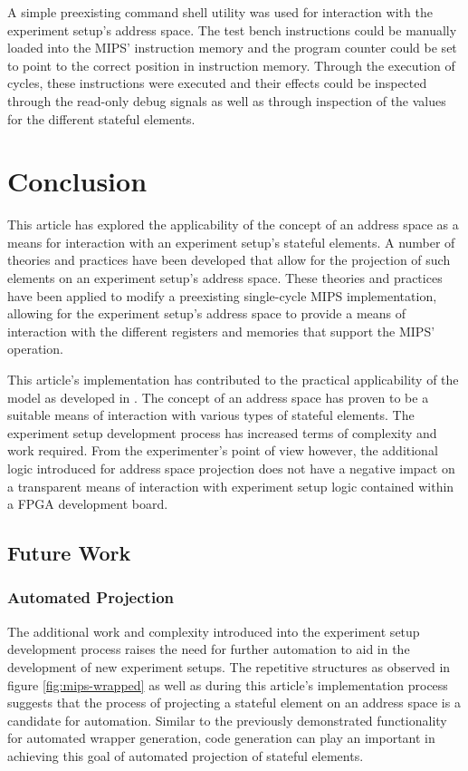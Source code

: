 \documentclass{article}
\begin{document}
A simple preexisting command shell utility was used for interaction with the experiment setup's address space. The test bench instructions could be manually loaded into the MIPS' instruction memory and the program counter could be set to point to the correct position in instruction memory. Through the execution of cycles, these instructions were executed and their effects could be inspected through the read-only debug signals as well as through inspection of the values for the different stateful elements. 




\section{Conclusion}
This article has explored the applicability of the concept of an address space as a means for interaction with an experiment setup's stateful elements. A number of theories and practices have been developed that allow for the projection of such elements on an experiment setup's address space. These theories and practices have been applied to modify a preexisting single-cycle MIPS implementation, allowing for the experiment setup's address space to provide a means of interaction with the different registers and memories that support the MIPS' operation. 

This article's implementation has contributed to the practical applicability of the model as developed in \cite{bos2016model}. The concept of an address space has proven to be a suitable means of interaction with various types of stateful elements. The experiment setup development process has increased terms of complexity and work required. From the experimenter's point of view however, the additional logic introduced for address space projection does not have a negative impact on a transparent means of interaction with experiment setup logic contained within a FPGA development board.

\subsection{Future Work}

\subsubsection{Automated Projection}
The additional work and complexity introduced into the experiment setup development process raises the need for further automation to aid in the development of new experiment setups. The repetitive structures as observed in figure \ref{fig:mips-wrapped} as well as during this article's implementation process suggests that the process of projecting a stateful element on an address space is a candidate for automation. Similar to the previously demonstrated functionality for automated wrapper generation, code generation can play an important in achieving this goal of automated projection of stateful elements. 
\end{document}
